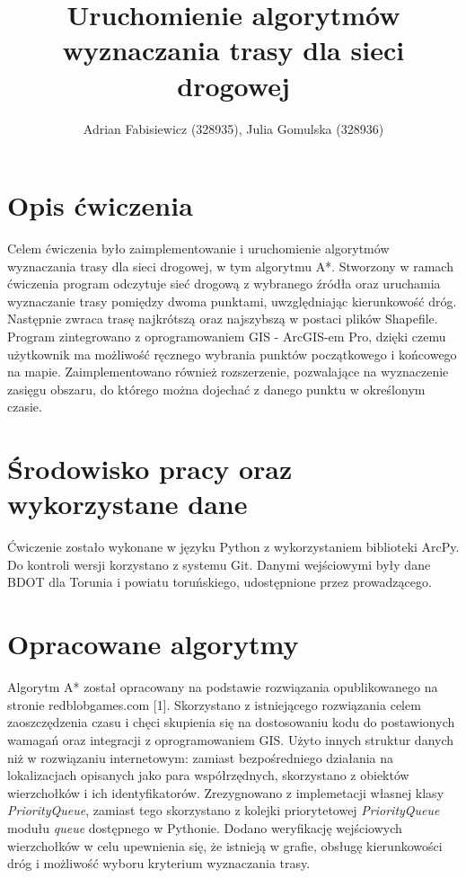 \documentclass{article}
\title{Uruchomienie algorytmów wyznaczania trasy dla sieci drogowej}
\author{Adrian Fabisiewicz (328935), Julia Gomulska (328936)}
\begin{document}
\maketitle
\renewcommand{\labelenumii}{\arabic{enumi}.\arabic{enumii}}
\renewcommand{\labelenumiii}{\arabic{enumi}.\arabic{enumii}.\arabic{enumiii}}
\renewcommand{\labelenumiv}{\arabic{enumi}.\arabic{enumii}.\arabic{enumiii}.\arabic{enumiv}}

\section{Opis ćwiczenia}

Celem ćwiczenia było zaimplementowanie i uruchomienie algorytmów wyznaczania trasy dla sieci drogowej, w tym algorytmu A*. Stworzony w ramach ćwiczenia program odczytuje sieć drogową z wybranego źródła oraz uruchamia wyznaczanie trasy pomiędzy dwoma punktami, uwzględniając kierunkowość dróg. Następnie zwraca trasę najkrótszą oraz najszybszą w postaci plików Shapefile. Program zintegrowano z oprogramowaniem GIS - ArcGIS-em Pro, dzięki czemu użytkownik ma możliwość ręcznego wybrania punktów początkowego i końcowego na mapie. Zaimplementowano również rozszerzenie, pozwalające na wyznaczenie zasięgu obszaru, do którego można dojechać z danego punktu w określonym czasie.

\section{Środowisko pracy oraz wykorzystane dane}
Ćwiczenie zostało wykonane w języku Python z wykorzystaniem biblioteki ArcPy. Do kontroli wersji korzystano z systemu Git. Danymi wejściowymi były dane BDOT dla Torunia i powiatu toruńskiego, udostępnione przez prowadzącego.

\section{Opracowane algorytmy}
Algorytm A* został opracowany na podstawie rozwiązania opublikowanego na stronie redblobgames.com [1].
Skorzystano z istniejącego rozwiązania celem zaoszczędzenia czasu i chęci skupienia się na dostosowaniu kodu do postawionych wamagań oraz integracji z oprogramowaniem GIS.
Użyto innych struktur danych niż w rozwiązaniu internetowym: zamiast bezpośredniego działania na lokalizacjach opisanych jako para współrzędnych, skorzystano z obiektów wierzchołków i ich identyfikatorów.
Zrezygnowano z implemetacji własnej klasy \textit{PriorityQueue}, zamiast tego skorzystano z kolejki priorytetowej \textit{PriorityQueue} modułu \textit{queue} dostępnego w Pythonie.
Dodano weryfikację wejściowych wierzchołków w celu upewnienia się, że istnieją w grafie, obsługę kierunkowości dróg i możliwość wyboru kryterium wyznaczania trasy. 
\end{document}
